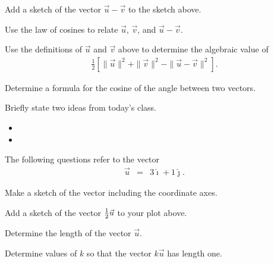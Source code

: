 \begin{problem}
  \begin{subproblem}
    \item Add a sketch of the vector $\vec{u}-\vec{v}$ to the sketch above.
    \item Use the law of cosines to relate $\vec{u}$, $\vec{v}$, and $\vec{u}-\vec{v}$.
      \vspace{4em}
    \item Use the definitions of $\vec{u}$ and $\vec{v}$ above to determine the algebraic value of
    \begin{eqnarray*}
      \frac{1}{2} \left[ \|\vec{u}\|^2 +  \|\vec{v}\|^2 -  \|\vec{u}-\vec{v}\|^2\right].
    \end{eqnarray*}
    \vfill
    \item Determine a formula for the cosine of the angle between two vectors.
    \vspace{4em}
  \end{subproblem}

\end{problem}


\postClass

\begin{problem}
\item Briefly state two ideas from today's class.
  \begin{itemize}
  \item
  \item
  \end{itemize}
\item
  \begin{subproblem}
    \item
  \end{subproblem}
\end{problem}


\begin{problem}
\item The following questions refer to the vector
\begin{eqnarray*}
  \vec{u} & = & 3 \hat{\imath} + 1 \hat{\jmath}.
\end{eqnarray*}
\begin{subproblem}
    \item Make a sketch of the vector including the coordinate axes.
    \vfill
    \item Add a sketch of the vector $\mbox{$\frac{1}{2}$} \vec{u}$ to your plot above.
    \item Determine the length of the vector $\vec{u}$.
    \vfill
    \item Determine values of $k$ so that the vector $k \vec{u}$ has length one.
    \vfill
\end{subproblem}
\end{problem}


